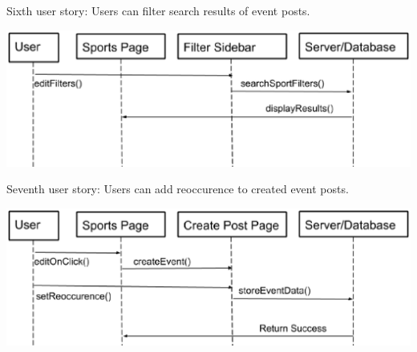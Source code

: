 \documentclass[a4paper]{article}
\begin{document}
Sixth user story: Users can filter search results of event posts.

\includegraphics[width=\textwidth]{filter}

Seventh user story: Users can add reoccurence to created event posts.

\includegraphics[width=\textwidth]{reoccurence}

\newpage
\end{document}
